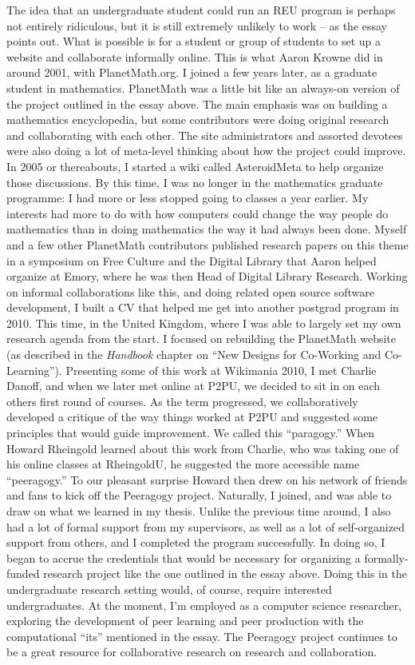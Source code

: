 The idea that an undergraduate student could run an REU program is
perhaps not entirely ridiculous, but it is still extremely unlikely to
work -- as the essay points out. What is possible is for a student or
group of students to set up a website and collaborate informally online.
This is what Aaron Krowne did in around 2001, with PlanetMath.org. I
joined a few years later, as a graduate student in mathematics.
PlanetMath was a little bit like an always-on version of the project
outlined in the essay above. The main emphasis was on building a
mathematics encyclopedia, but some contributors were doing original
research and collaborating with each other. The site administrators and
assorted devotees were also doing a lot of meta-level thinking about how
the project could improve. In 2005 or thereabouts, I started a wiki
called AsteroidMeta to help organize those discussions. By this time, I
was no longer in the mathematics graduate programme: I had more or less
stopped going to classes a year earlier. My interests had more to do
with how computers could change the way people do mathematics than in
doing mathematics the way it had always been done. Myself and a few
other PlanetMath contributors published research papers on this theme in
a symposium on Free Culture and the Digital Library that Aaron helped
organize at Emory, where he was then Head of Digital Library Research.
Working on informal collaborations like this, and doing related open
source software development, I built a CV that helped me get into
another postgrad program in 2010. This time, in the United Kingdom,
where I was able to largely set my own research agenda from the start. I
focused on rebuilding the PlanetMath website (as described in the
\emph{Handbook} chapter on ``New Designs for Co-Working and
Co-Learning''). Presenting some of this work at Wikimania 2010, I met
Charlie Danoff, and when we later met online at P2PU, we decided to sit
in on each others first round of courses. As the term progressed, we
collaboratively developed a critique of the way things worked at P2PU
and suggested some principles that would guide improvement. We called
this ``paragogy.'' When Howard Rheingold learned about this work from
Charlie, who was taking one of his online classes at RheingoldU, he
suggested the more accessible name ``peeragogy.'' To our pleasant
surprise Howard then drew on his network of friends and fans to kick off
the Peeragogy project. Naturally, I joined, and was able to draw on what
we learned in my thesis. Unlike the previous time around, I also had a
lot of formal support from my supervisors, as well as a lot of
self-organized support from others, and I completed the program
successfully. In doing so, I began to accrue the credentials that would
be necessary for organizing a formally-funded research project like the
one outlined in the essay above. Doing this in the undergraduate
research setting would, of course, require interested undergraduates. At
the moment, I'm employed as a computer science researcher, exploring the
development of peer learning and peer production with the computational
``its'' mentioned in the essay. The Peeragogy project continues to be a
great resource for collaborative research on research and collaboration.

